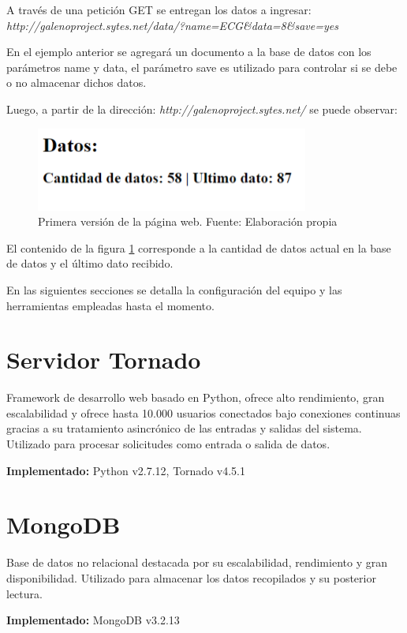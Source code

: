 A través de una petición GET se entregan los datos a ingresar:\\ \textit{http://galenoproject.sytes.net/data/?name=ECG\&data=8\&save=yes}

En el ejemplo anterior se agregará un documento a la base de datos con los parámetros name y data, el parámetro save es utilizado para controlar si se debe o no almacenar dichos datos.

Luego, a partir de la dirección: \textit{http://galenoproject.sytes.net/} se puede observar:

\begin{figure}[H]
	\centering
	\includegraphics[scale=0.6]{figuras/servidor/primera_version.png}
	\caption{Primera versión de la página web. Fuente: Elaboración propia}
	\label{first_example}
\end{figure}

El contenido de la figura \ref{first_example} corresponde a la cantidad de datos actual en la base de datos y el último dato recibido. 

En las siguientes secciones se detalla la configuración del equipo y las herramientas empleadas hasta el momento.

\newpage
\section{Servidor Tornado}
Framework de desarrollo web basado en Python, ofrece alto rendimiento, gran escalabilidad y ofrece hasta 10.000 usuarios conectados bajo conexiones continuas gracias a su tratamiento asincrónico de las entradas y salidas del sistema. Utilizado para procesar solicitudes como entrada o salida de datos.

\textbf{Implementado:} Python v2.7.12, Tornado v4.5.1

\section{MongoDB}
Base de datos no relacional destacada por su escalabilidad, rendimiento y gran disponibilidad. Utilizado para almacenar los datos recopilados y su posterior lectura.

\textbf{Implementado:} MongoDB v3.2.13

